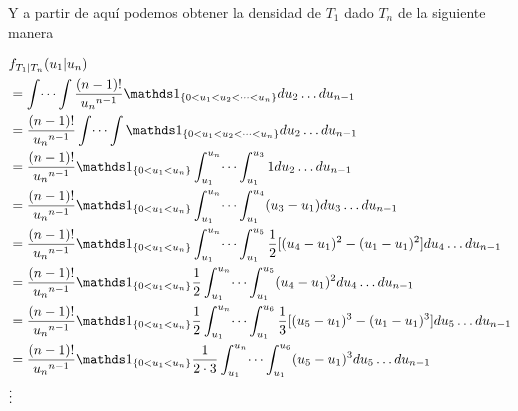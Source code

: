 Y a partir de aquí podemos obtener la densidad de $T_1$ dado $T_n$ de la siguiente manera

\begin{align}
    &f_{T_1 | T_n}(u_1 | u_n)                                                                                                                                                           \\
    &=  \int \dots \int \frac{(n-1)!}{{u_n}^{n-1}} \indic_{\{ 0 < u_1 < u_2< \dots <u_{n}\}}    du_2 \dots du_{n-1}                                                                     \\
    &=  \frac{(n-1)!}{{u_n}^{n-1}} \int \dots \int  \indic_{\{ 0 < u_1 < u_2< \dots <u_{n}\}}   du_2 \dots du_{n-1}                                                                     \\
    &=  \frac{(n-1)!}{{u_n}^{n-1}} \indic_{\{ 0 < u_1 < u_{n}\}} \int_{u_1}^{u_n} \dots \int_{u_1}^{u_3} 1 du_2 \dots du_{n-1}                                                          \\
    &=  \frac{(n-1)!}{{u_n}^{n-1}} \indic_{\{ 0 < u_1 < u_{n}\}} \int_{u_1}^{u_n} \dots \int_{u_1}^{u_4} (u_3 - u_1) du_3 \dots du_{n-1}                                                \\
    &=  \frac{(n-1)!}{{u_n}^{n-1}} \indic_{\{ 0 < u_1 < u_{n}\}} \int_{u_1}^{u_n} \dots \int_{u_1}^{u_5} \frac{1}{2} [(u_4 - u_1)^2 - (u_1 - u_1)^2] du_4 \dots du_{n-1}                \\
    &=  \frac{(n-1)!}{{u_n}^{n-1}} \indic_{\{ 0 < u_1 < u_{n}\}} \frac{1}{2} \int_{u_1}^{u_n} \dots \int_{u_1}^{u_5} (u_4 - u_1)^2 du_4 \dots du_{n-1}                                  \\
    &=  \frac{(n-1)!}{{u_n}^{n-1}} \indic_{\{ 0 < u_1 < u_{n}\}} \frac{1}{2} \int_{u_1}^{u_n} \dots \int_{u_1}^{u_6} \frac{1}{3} [(u_5 - u_1)^3 - (u_1 - u_1)^3] du_5 \dots du_{n-1}    \\ 
    &=  \frac{(n-1)!}{{u_n}^{n-1}} \indic_{\{ 0 < u_1 < u_{n}\}} \frac{1}{2 \cdot 3} \int_{u_1}^{u_n} \dots \int_{u_1}^{u_6} (u_5 - u_1)^3 du_5 \dots du_{n-1}                          \\
    &\vdots                                                                                                                                                                             \\                                                                                                                                                 \\

\end{align}
